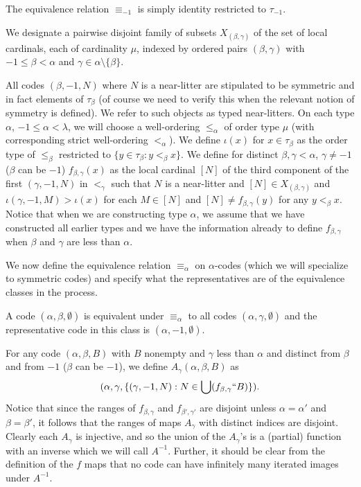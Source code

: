 \documentclass[112pt]{article}
\begin{document}
The equivalence relation $\equiv_{-1}$ is simply identity restricted to $\tau_{-1}$.

We designate a pairwise disjoint family of subsets $X_{(\beta,\gamma)}$ of the set of local cardinals, each of cardinality $\mu$, indexed by ordered pairs $(\beta,\gamma)$ with $-1 \leq \beta <\alpha$ and $\gamma \in \alpha \setminus \{\beta\}$.

All codes $(\beta,-1,N)$ where $N$ is a near-litter are stipulated to be symmetric and in fact elements of $\tau_\beta$ (of course we need to verify this when the relevant notion of symmetry is defined).   We refer to such objects as typed near-litters.   On each type $\alpha$, $-1 \leq \alpha <\lambda$, we will choose a well-ordering $\leq_\alpha$ of order type $\mu$ (with corresponding strict well-ordering $<_\alpha$).  We define $\iota(x)$ for $x \in \tau_\beta$ as the order type of $\leq_\beta$ restricted to $\{y \in \tau_\beta:y <_\beta x\}$.  We define for distinct $\beta,\gamma<\alpha$, $\gamma \neq -1$ ($\beta$ can be $-1$)  $f_{\beta,\gamma}(x)$ as the local cardinal $[N]$ of the third component of the first $(\gamma,-1,N)$ in $<_\gamma$ such that $N$ is a near-litter and $[N] \in X_{(\beta,\gamma)}$ and $\iota(\gamma,-1,M)>\iota(x)$ for each $M \in [N]$ and $[N] \neq f_{\beta,\gamma}(y)$ for any $y <_\beta x$.  Notice that when we are constructing type $\alpha$, we assume that we have constructed all earlier types and we have the information already to define $f_{\beta,\gamma}$ when $\beta$ and $\gamma$ are less than $\alpha$.

We now define the equivalence relation $\equiv_\alpha$ on $\alpha$-codes (which we will specialize to symmetric codes) and specify what the representatives are of the equivalence classes in the process.

A code $(\alpha,\beta,\emptyset)$ is equivalent under $\equiv_\alpha$ to all codes $(\alpha,\gamma,\emptyset)$ and the representative code in this class is $(\alpha,-1,\emptyset)$.

For any code $(\alpha,\beta,B)$ with $B$ nonempty and $\gamma$ less than $\alpha$ and distinct from $\beta$ and from $-1$ ($\beta$ can be $-1$), we define
$A_\gamma(\alpha,\beta,B)$ as $$(\alpha,\gamma,\{(\gamma,-1,N):N \in \bigcup (f_{\beta,\gamma}``B)\}).$$ Notice that since the ranges of $f_{\beta,\gamma}$ and $f_{\beta',\gamma'}$ are disjoint unless $\alpha=\alpha'$ and $\beta=\beta'$, it follows that the ranges of
maps $A_\gamma$ with distinct indices are disjoint.  Clearly each $A_\gamma$ is injective, and so the union of the $A_\gamma$'s is a (partial) function with an inverse which we will call $A^{-1}$.  Further, it should be clear from the definition of the $f$ maps that
no code can have infinitely many iterated images under $A^{-1}$.
\end{document}
